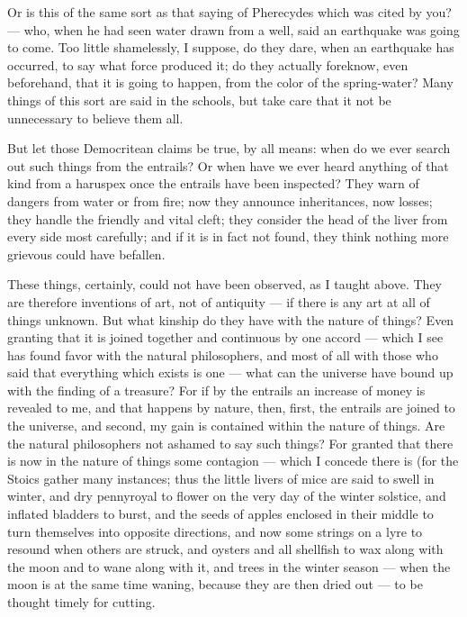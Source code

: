  Or is this of the same sort as that saying of Pherecydes which was cited by you? — who, when he had seen water drawn from a well, said an earthquake was going to come. Too little shamelessly, I suppose, do they dare, when an earthquake has occurred, to say what force produced it; do they actually foreknow, even beforehand, that it is going to happen, from the color of the spring-water? Many things of this sort are said in the schools, but take care that it not be unnecessary to believe them all.

 But let those Democritean claims be true, by all means: when do we ever search out such things from the entrails? Or when have we ever heard anything of that kind from a haruspex once the entrails have been inspected? They warn of dangers from water or from fire; now they announce inheritances, now losses; they handle the friendly and vital cleft; they consider the head of the liver from every side most carefully; and if it is in fact not found, they think nothing more grievous could have befallen.

 These things, certainly, could not have been observed, as I taught above. They are therefore inventions of art, not of antiquity — if there is any art at all of things unknown. But what kinship do they have with the nature of things? Even granting that it is joined together and continuous by one accord — which I see has found favor with the natural philosophers, and most of all with those who said that everything which exists is one — what can the universe have bound up with the finding of a treasure? For if by the entrails an increase of money is revealed to me, and that happens by nature, then, first, the entrails are joined to the universe, and second, my gain is contained within the nature of things. Are the natural philosophers not ashamed to say such things? For granted that there is now in the nature of things some contagion — which I concede there is (for the Stoics gather many instances; thus the little livers of mice are said to swell in winter, and dry pennyroyal to flower on the very day of the winter solstice, and inflated bladders to burst, and the seeds of apples enclosed in their middle to turn themselves into opposite directions, and now some strings on a lyre to resound when others are struck, and oysters and all shellfish to wax along with the moon and to wane along with it, and trees in the winter season — when the moon is at the same time waning, because they are then dried out — to be thought timely for cutting.

